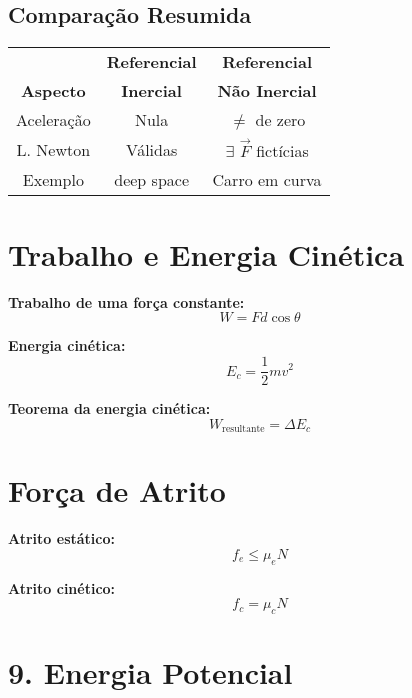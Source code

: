 \documentclass[a4paper,12pt]{article}
\begin{document}
\begin{multicols}{2}
\subsection{Comparação Resumida}

\begin{tabular}{|c|c|c|}
\hline
& \textbf{Referencial}& \textbf{Referencial}\\
\textbf{Aspecto} & \textbf{Inercial} & \textbf{Não Inercial} \\
\hline
Aceleração & Nula & $\neq$ de zero \\
L. Newton & Válidas & $\exists$ $\vec{F}$ fictícias \\
Exemplo & deep space & Carro em curva \\
\hline
\end{tabular}



\section{Trabalho e Energia Cinética}

\textbf{Trabalho de uma força constante:}
\begin{equation*}
  W = F d \cos \theta
\end{equation*}

\textbf{Energia cinética:}
\begin{equation*}
  E_c = \frac{1}{2} m v^2
\end{equation*}

\textbf{Teorema da energia cinética:}
\begin{equation*}
  W_{\text{resultante}} = \Delta E_c
\end{equation*}

\section{Força de Atrito}

\textbf{Atrito estático:}
\begin{equation*}
  f_e \leq \mu_e N
\end{equation*}

\textbf{Atrito cinético:}
\begin{equation*}
  f_c = \mu_c N
\end{equation*}

\section{9. Energia Potencial}


\end{multicols}
\end{document}

